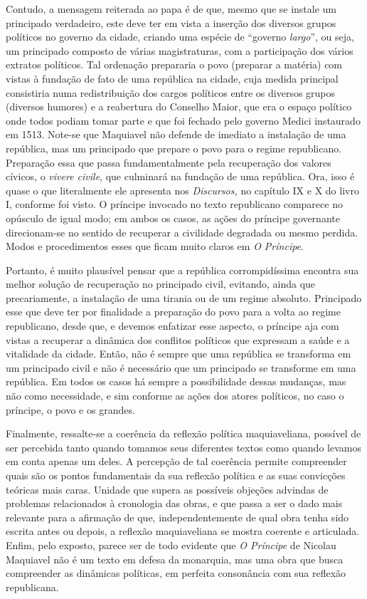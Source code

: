 Contudo, a mensagem reiterada ao papa é de que, mesmo que se instale um
principado verdadeiro, este deve ter em vista a inserção dos diversos
grupos políticos no governo da cidade, criando uma espécie de ``governo
\emph{largo}'', ou seja, um principado composto de várias magistraturas,
com a participação dos vários extratos políticos. Tal ordenação
prepararia o povo (preparar a matéria) com vistas à fundação de fato de
uma república na cidade, cuja medida principal consistiria numa
redistribuição dos cargos políticos entre os diversos grupos (diversos
humores) e a reabertura do Conselho Maior, que era o espaço político
onde todos podiam tomar parte e que foi fechado pelo governo Medici
instaurado em 1513. Note-se que Maquiavel não defende de imediato a
instalação de uma república, mas um principado que prepare o povo para o
regime republicano. Preparação essa que passa fundamentalmente pela
recuperação dos valores cívicos, o \emph{vivere civile}, que culminará
na fundação de uma república. Ora, isso é quase o que literalmente ele
apresenta nos \emph{Discursos,} no capítulo IX e X do livro I, conforme
foi visto. O príncipe invocado no texto republicano comparece no
opúsculo de igual modo; em ambos os casos, as ações do príncipe
governante direcionam-se no sentido de recuperar a civilidade degradada
ou mesmo perdida. Modos e procedimentos esses que ficam muito claros em
\emph{O Príncipe}.

Portanto, é muito plausível pensar que a república corrompidíssima
encontra sua melhor solução de recuperação no principado civil,
evitando, ainda que precariamente, a instalação de uma tirania ou de um
regime absoluto. Principado esse que deve ter por finalidade a
preparação do povo para a volta ao regime republicano, desde que, e
devemos enfatizar esse aspecto, o príncipe aja com vistas a recuperar a
dinâmica dos conflitos políticos que expressam a saúde e a vitalidade da
cidade. Então, não é sempre que uma república se transforma em um
principado civil e não é necessário que um principado se transforme em
uma república. Em todos os casos há sempre a possibilidade dessas
mudanças, mas não como necessidade, e sim conforme as ações dos atores
políticos, no caso o príncipe, o povo e os grandes.

Finalmente, ressalte-se a coerência da reflexão política maquiaveliana,
possível de ser percebida tanto quando tomamos seus diferentes textos
como quando levamos em conta apenas um deles. A percepção de tal
coerência permite compreender quais são os pontos fundamentais da sua
reflexão política e as suas convicções teóricas mais caras. Unidade que
supera as possíveis objeções advindas de problemas relacionados à
cronologia das obras, e que passa a ser o dado mais relevante para a
afirmação de que, independentemente de qual obra tenha sido escrita
antes ou depois, a reflexão maquiaveliana se mostra coerente e
articulada. Enfim, pelo exposto, parece ser de todo evidente que \emph{O
Príncipe} de Nicolau Maquiavel não é um texto em defesa da monarquia,
mas uma obra que busca compreender as dinâmicas políticas, em perfeita
consonância com sua reflexão republicana.
